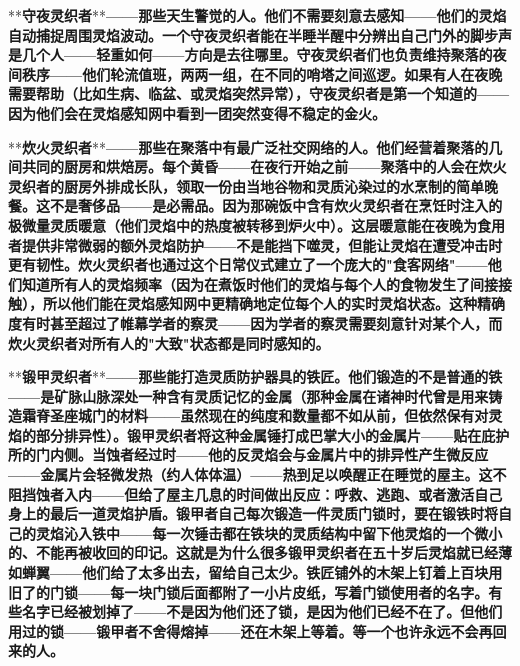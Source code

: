 \documentclass[12pt,a4paper,openany]{ctexbook}
\begin{document}
**\textbf{守夜灵织者}**\textbf{——那些天生警觉的人。他们不需要刻意去感知——他们的灵焰自动捕捉周围灵焰波动。一个守夜灵织者能在半睡半醒中分辨出自己门外的脚步声是几个人——轻重如何——方向是去往哪里。守夜灵织者们也负责维持聚落的夜间秩序——他们轮流值班，两两一组，在不同的哨塔之间巡逻。如果有人在夜晚需要帮助（比如生病、临盆、或灵焰突然异常），守夜灵织者是第一个知道的——因为他们会在灵焰感知网中看到一团突然变得不稳定的金火。}


**\textbf{炊火灵织者}**\textbf{——那些在聚落中有最广泛社交网络的人。他们经营着聚落的几间共同的厨房和烘焙房。每个黄昏——在夜行开始之前——聚落中的人会在炊火灵织者的厨房外排成长队，领取一份由当地谷物和灵质沁染过的水烹制的简单晚餐。这不是奢侈品——是必需品。因为那碗饭中含有炊火灵织者在烹饪时注入的极微量灵质暖意（他们灵焰中的热度被转移到炉火中）。这层暖意能在夜晚为食用者提供非常微弱的额外灵焰防护——不是能挡下噬灵，但能让灵焰在遭受冲击时更有韧性。炊火灵织者也通过这个日常仪式建立了一个庞大的"食客网络"——他们知道所有人的灵焰频率（因为在煮饭时他们的灵焰与每个人的食物发生了间接接触），所以他们能在灵焰感知网中更精确地定位每个人的实时灵焰状态。这种精确度有时甚至超过了帷幕学者的察灵——因为学者的察灵需要刻意针对某个人，而炊火灵织者对所有人的"大致"状态都是同时感知的。}


**\textbf{锻甲灵织者}**\textbf{——那些能打造灵质防护器具的铁匠。他们锻造的不是普通的铁——是矿脉山脉深处一种含有灵质记忆的金属（那种金属在诸神时代曾是用来铸造霜脊圣座城门的材料——虽然现在的纯度和数量都不如从前，但依然保有对灵焰的部分排异性）。锻甲灵织者将这种金属锤打成巴掌大小的金属片——贴在庇护所的门内侧。当蚀者经过时——他的反灵焰会与金属片中的排异性产生微反应——金属片会轻微发热（约人体体温）——热到足以唤醒正在睡觉的屋主。这不阻挡蚀者入内——但给了屋主几息的时间做出反应：呼救、逃跑、或者激活自己身上的最后一道灵焰护盾。锻甲者自己每次锻造一件灵质门锁时，要在锻铁时将自己的灵焰沁入铁中——每一次锤击都在铁块的灵质结构中留下他灵焰的一个微小的、不能再被收回的印记。这就是为什么很多锻甲灵织者在五十岁后灵焰就已经薄如蝉翼——他们给了太多出去，留给自己太少。铁匠铺外的木架上钉着上百块用旧了的门锁——每一块门锁后面都附了一小片皮纸，写着门锁使用者的名字。有些名字已经被划掉了——不是因为他们还了锁，是因为他们已经不在了。但他们用过的锁——锻甲者不舍得熔掉——还在木架上等着。等一个也许永远不会再回来的人。}
\end{document}
